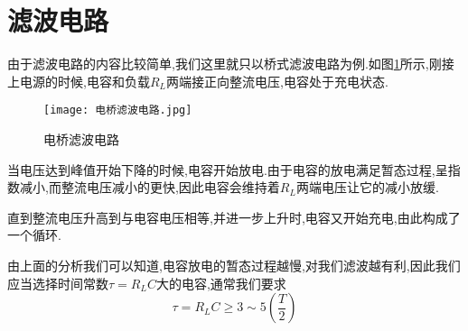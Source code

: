 \section{\K 滤波电路}
\Par 由于滤波电路的内容比较简单,我们这里就只以桥式滤波电路为例.如图\ref{fig:电桥滤波电路}所示,刚接上电源的时候,电容和负载$R_L$两端接正向整流电压,电容处于充电状态.

\begin{figure}[htbp]
	\centering
	\texttt{[image: 电桥滤波电路.jpg]}
	\caption{电桥滤波电路}
	\label{fig:电桥滤波电路}
\end{figure}

\Par 当电压达到峰值开始下降的时候,电容开始放电.由于电容的放电满足暂态过程,呈指数减小,而整流电压减小的更快,因此电容会维持着$R_L$两端电压让它的减小放缓.

\Par 直到整流电压升高到与电容电压相等,并进一步上升时,电容又开始充电,由此构成了一个循环.

\Par 由上面的分析我们可以知道,电容放电的暂态过程越慢,对我们滤波越有利,因此我们应当选择时间常数$\tau =R_LC$大的电容,通常我们要求
\begin{equation}
    \tau =R_LC\ge 3\sim 5\left( \frac{T}{2} \right) 
\end{equation}